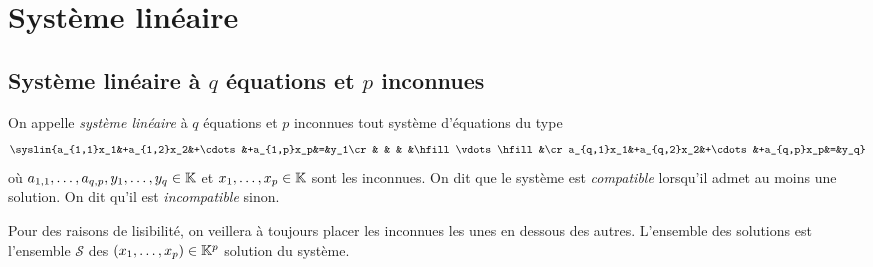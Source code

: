 \documentclass{magnolia}
\begin{document}
\section{Système linéaire}


\subsection{Système linéaire à $q$ équations et $p$ inconnues}

\begin{definition}[utile=-3]
On appelle \emph{système linéaire} à $q$ équations et $p$ inconnues tout système
d'équations du type
\[\syslin{a_{1,1}x_1&+a_{1,2}x_2&+\cdots&+a_{1,p}x_p&=&y_1\cr
                   &          &       &          &\hfill\vdots\hfill&\cr
          a_{q,1}x_1&+a_{q,2}x_2&+\cdots&+a_{q,p}x_p&=&y_q}\]
où $a_{1,1},\ldots,a_{q,p},y_1,\ldots,y_q\in\mathbb{K}$ et $x_1,\ldots,x_p\in\mathbb{K}$ sont
les inconnues. On dit que le système est \emph{compatible} lorsqu'il admet au moins une
solution. On dit qu'il est \emph{incompatible} sinon.
\end{definition}

\begin{remarques}
\remarque Pour des raisons de lisibilité, on veillera à toujours placer les inconnues
  les unes en dessous des autres.
\remarque L'ensemble des solutions est l'ensemble $\mathcal{S}$ des
  $(x_1,\ldots,x_p)\in\mathbb{K}^p$ solution du système.
\end{remarques}

\end{document}

